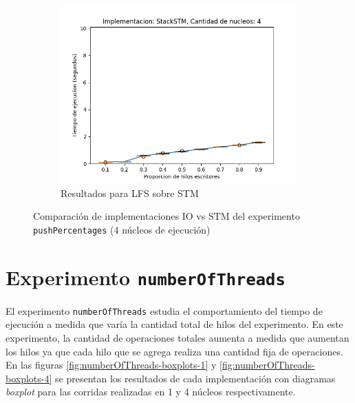 \begin{appendices}
\begin{figure}[t]
\begin{subfigure}[b]{0.49\textwidth}
        \includegraphics[width=\textwidth]{images/pushPercentages/plots/expStackSTM-4}
        \caption{Resultados para LFS sobre STM}
        \label{subfig:pushPercentages-stackstm-4}
    \end{subfigure}
    \caption{Comparación de implementaciones IO vs STM del experimento \texttt{pushPercentages} (4 núcleos de ejecución)}
    \label{fig:pushPercentages-boxplots-4}
\end{figure}

\section{Experimento \texttt{numberOfThreads}}

El experimento \texttt{numberOfThreads} estudia el comportamiento del tiempo de ejecución a medida que varía la cantidad total de hilos del experimento. En este experimento, la cantidad de operaciones totales aumenta a medida que aumentan los hilos ya que cada hilo que se agrega realiza una cantidad fija de operaciones. En las figuras \ref{fig:numberOfThreads-boxplots-1} y \ref{fig:numberOfThreads-boxplots-4} se presentan los resultados de cada implementación con diagramas \emph{boxplot} para las corridas realizadas en 1 y 4 núcleos respectivamente.


\end{appendices}
